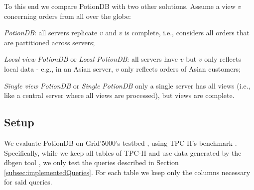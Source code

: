 \documentclass[sigconf, nonacm]{acmart}
\begin{document}
To this end we compare PotionDB with two other solutions.
Assume a view $v$ concerning orders from all over the globe:

\begin{compactitem}
	\item \emph{PotionDB}: all servers replicate $v$ and $v$ is complete, i.e., considers all orders that are partitioned across servers;
	\item \emph{Local view PotionDB} or \emph{Local PotionDB}: all servers have $v$ but $v$ only reflects local data - e.g., in an Asian server, \emph{v} only reflects orders of Asian customers;
	\item \emph{Single view PotionDB} or \emph{Single PotionDB} only a single server has all views (i.e., like a central server where all views are processed), but views are complete.
\end{compactitem}



\subsection{Setup}
\label{subsec:setup}

We evaluate PotionDB on Grid'5000's testbed \cite{Grid5000}, using TPC-H's benchmark \cite{tpch}.
Specifically, while we keep all tables of TPC-H and use data generated by the dbgen tool \cite{tpch}, we only test the queries described in Section \ref{subsec:implementedQueries}.
For each table we keep only the columns necessary for said queries. 
\end{document}
